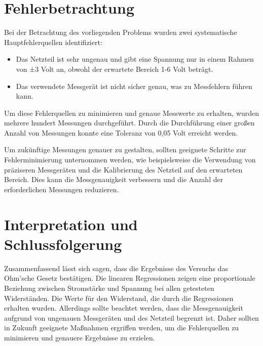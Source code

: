 \documentclass[10pt]{article}
\begin{document}
\section{Fehlerbetrachtung}
Bei der Betrachtung des vorliegenden Problems wurden zwei systematische Hauptfehlerquellen identifiziert:
\begin{itemize}
    \item Das Netzteil ist sehr ungenau und gibt eine Spannung nur in einem Rahmen von ±3 Volt an, obwohl der erwartete Bereich 1-6 Volt beträgt.
    \item  Das verwendete Messgerät ist nicht sicher genau, was zu Messfehlern führen kann.
\end{itemize}
Um diese Fehlerquellen zu minimieren und genaue Messwerte zu erhalten, wurden mehrere hundert Messungen durchgeführt. Durch die Durchführung einer großen Anzahl von Messungen konnte eine Toleranz von 0,05 Volt erreicht werden.

Um zukünftige Messungen genauer zu gestalten, sollten geeignete Schritte zur Fehlerminimierung unternommen werden, wie beispielsweise die Verwendung von präziseren Messgeräten und die Kalibrierung des Netzteil auf den erwarteten Bereich. Dies kann die Messgenauigkeit verbessern und die Anzahl der erforderlichen Messungen reduzieren.

\section{Interpretation und Schlussfolgerung}

Zusammenfassend lässt sich sagen, dass die Ergebnisse des Versuchs das Ohm'sche Gesetz bestätigen. Die linearen Regressionen zeigen eine proportionale Beziehung zwischen Stromstärke und Spannung bei allen getesteten Widerständen. Die Werte für den Widerstand, die durch die Regressionen erhalten wurden. Allerdings sollte beachtet werden, dass die Messgenauigkeit aufgrund von ungenauen Messgeräten und des Netzteil begrenzt ist. Daher sollten in Zukunft geeignete Maßnahmen ergriffen werden, um die Fehlerquellen zu minimieren und genauere Ergebnisse zu erzielen.
\end{document}
